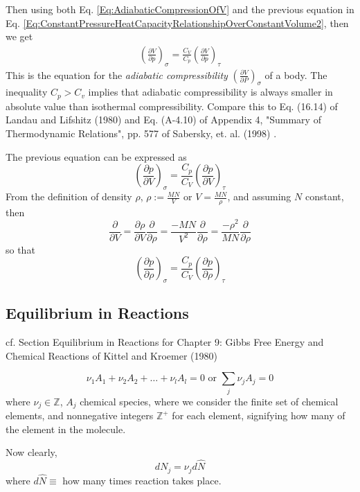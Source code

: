 \documentclass[10pt]{amsart}
\begin{document}
\begin{multicols*}{2}
Then using both Eq. \ref{Eq:AdiabaticCompressionOfV} and the previous equation in Eq. \ref{Eq:ConstantPressureHeatCapacityRelationshipOverConstantVolume2}, then we get 
\begin{equation}
\begin{gathered}
\boxed{ \left( \frac{\partial V}{\partial p }\right)_{\sigma} = \frac{C_V}{C_p} \left( \frac{\partial V}{\partial p } \right)_{\tau} }
\end{gathered}
\end{equation}
This is the equation for the \emph{adiabatic compressibility} $\left( \frac{\partial V}{ \partial P} \right)_{\sigma}$ of a body. The inequality $C_p > C_v$ implies that adiabatic compressibility is always smaller in absolute value than isothermal compressibility. Compare this to Eq. (16.14) of Landau and Lifshitz (1980) and Eq. (A-4.10) of Appendix 4, "Summary of Thermodynamic Relations", pp. 577 of Sabersky, et. al. (1998) \cite{SAHG1998}.

The previous equation can be expressed as 
\[
\left(\frac{\partial p}{\partial V }\right)_{\sigma} = \frac{C_p}{C_V} \left( \frac{\partial p}{\partial V } \right)_{\tau} 
\]
From the definition of density $\rho$, $\rho := \frac{MN}{V}$ or $V = \frac{MN}{\rho}$, and assuming $N$ constant, then
\[
\frac{\partial}{\partial V} = \frac{\partial \rho}{\partial V} \frac{\partial }{\partial \rho} = \frac{-MN}{V^2} \frac{\partial}{\partial \rho} = \frac{-\rho^2}{MN} \frac{\partial }{\partial \rho}
\]
so that 
\[
\left(\frac{\partial p}{\partial \rho }\right)_{\sigma} = \frac{C_p}{C_V} \left( \frac{\partial p}{\partial \rho  } \right)_{\tau} 
\]

\subsection{Equilibrium in Reactions}

cf. Section Equilibrium in Reactions for Chapter 9: Gibbs Free Energy and Chemical Reactions of Kittel and Kroemer (1980) \cite{CKittelHKroemer1980}

\begin{equation}
  \nu_1 A_1 + \nu_2 A_2 + \dots + \nu_l A_l = 0 \text{ or } \sum_j \nu_j A_j = 0
\end{equation}
where $\nu_j \in \mathbb{Z}$, $A_j$ chemical species, where we consider the finite set of chemical elements, and nonnegative integers $\mathbb{Z}^+$ for each element, signifying how many of the element in the molecule.  

Now clearly,
\[
dN_j = \nu_j d\widehat{N}
\]
where $d\widehat{N} \equiv$ how many times reaction takes place.


\end{multicols*}
\end{document}
